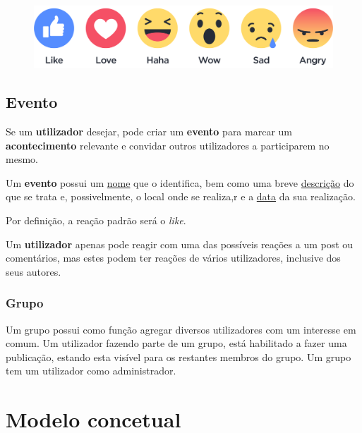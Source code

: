 \documentclass[12pt]{report}
\begin{document}
\begin{figure}[H]
    \centering
    \includegraphics[width=\textwidth]{reactions}
\end{figure}

\section{Evento}

Se um \textbf{utilizador} desejar, pode criar um \textbf{evento} para marcar um \textbf{acontecimento} relevante e convidar outros utilizadores a participarem no mesmo. \par

Um \textbf{evento} possui um \underline{nome} que o identifica, bem como uma breve \underline{descrição} do que se trata e, possivelmente, o local onde se realiza,r e a \underline{data} da sua realização.

Por definição, a reação padrão será o \textit{like}. \par

Um \textbf{utilizador} apenas pode reagir com uma das possíveis reações a um post ou comentários, mas estes podem ter reações de vários utilizadores, inclusive dos seus autores.

\subsection{Grupo}

Um grupo possui como função agregar diversos utilizadores com um interesse em comum. Um utilizador fazendo parte de um grupo, está habilitado a fazer uma publicação, estando esta visível para os restantes membros do grupo. Um grupo tem um utilizador como administrador.

\chapter{Modelo concetual}
\end{document}
